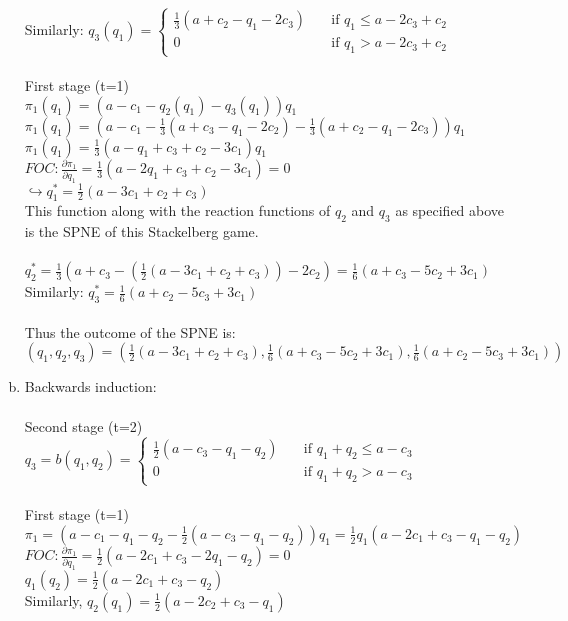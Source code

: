 \documentclass[a4paper]{article}
\begin{document}
\begin{enumerate}[(a)]
Similarly: $q_3(q_1)=\begin{cases}
\frac{1}{3}(a+c_2-q_1-2c_3) & \quad \text{if }
q_1 \le a-2c_3+c_2\\
0 & \quad \text{if } q_1>a-2c_3+c_2
\end{cases}
$\\ \\
First stage (t=1)\\
$\pi_1(q_1)=(a-c_1-q_2(q_1)-q_3(q_1))q_1$\\
$\pi_1(q_1)=(a-c_1-\frac{1}{3}(a+c_3-q_1-2c_2)-\frac{1}{3}(a+c_2-q_1-2c_3))q_1$\\
$\pi_1(q_1)=\frac{1}{3}(a-q_1+c_3+c_2-3c_1)q_1$\\
$FOC: \frac{\partial \pi_1}{\partial q_1}=\frac{1}{3}(a-2q_1+c_3+c_2-3c_1)=0$\\
$\hookrightarrow q_1^*=\frac{1}{2}(a-3c_1+c_2+c_3)$\\
This function along with the reaction functions of $q_2$ and $q_3$ as specified above is the SPNE of this Stackelberg game. \\ \\
$q_2^*=\frac{1}{3}(a+c_3-(\frac{1}{2}(a-3c_1+c_2+c_3))-2c_2)=\frac{1}{6}(a+c_3-5c_2+3c_1)$\\
Similarly: $q_3^*=\frac{1}{6}(a+c_2-5c_3+3c_1)$\\
\\Thus the outcome of the SPNE is:\\ $(q_1,q_2,q_3)=(\frac{1}{2}(a-3c_1+c_2+c_3),\frac{1}{6}(a+c_3-5c_2+3c_1),\frac{1}{6}(a+c_2-5c_3+3c_1))$ \clearpage 
\item
Backwards induction:\\ \\
Second stage (t=2)\\
$q_3=b(q_1,q_2)=
\begin{cases}
\frac{1}{2}(a-c_3-q_1-q_2) & \quad \text{if }
q_1+q_2 \le a-c_3\\
0 & \quad \text{if } q_1+q_2>a-c_3
\end{cases}$\\ \\
First stage (t=1)\\
$\pi_1=(a-c_1-q_1-q_2-\frac{1}{2}(a-c_3-q_1-q_2))q_1=\frac{1}{2}q_1(a-2c_1+c_3-q_1-q_2)$\\
$FOC: \frac{\partial\pi_1}{\partial q_1}=\frac{1}{2}(a-2c_1+c_3-2q_1-q_2)=0$\\
$q_1(q_2)=\frac{1}{2}(a-2c_1+c_3-q_2)$\\
Similarly, $q_2(q_1)=\frac{1}{2}(a-2c_2+c_3-q_1)$\\

\end{enumerate}
\end{document}
